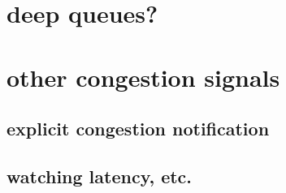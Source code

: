 \section{deep queues?}


\section{other congestion signals}



\subsection{explicit congestion notification}


\subsection{watching latency, etc.}


